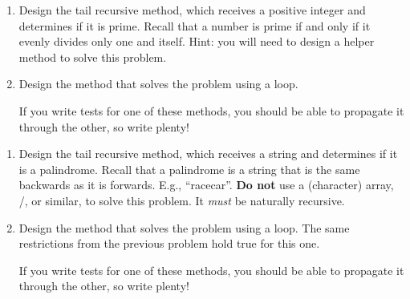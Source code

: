 


\begin{enumerate}[label=(\alph*)]
    \item Design the  tail recursive method, which receives a positive integer and determines if it is prime. Recall that a number is prime if and only if it evenly divides only one and itself. Hint: you will need to design a  helper method to solve this problem.
    \item Design the  method that solves the problem using a loop.

    If you write tests for one of these methods, you should be able to propagate it through the other, so write plenty!
\end{enumerate}

\begin{enumerate}[label=(\alph*)]
    \item Design the  tail recursive method, which receives a string and determines if it is a palindrome. Recall that a palindrome is a string that is the same backwards as it is forwards. E.g., ``racecar''. \textbf{Do not} use a (character) array, /, or similar, to solve this problem. It \textit{must} be naturally recursive.
    \item Design the  method that solves the problem using a loop. The same restrictions from the previous problem hold true for this one.

    If you write tests for one of these methods, you should be able to propagate it through the other, so write plenty!
\end{enumerate}

